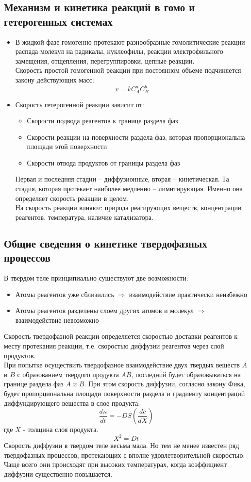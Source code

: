 \documentclass[14pt,a4paper]{scrartcl}
\begin{document}
\subsection*{Механизм и кинетика реакций в гомо и гетерогенных системах}
\begin{itemize}
	\item В жидкой фазе гомогенно протекают разнообразные гомолитические реакции распада молекул на радикалы, нуклеофилы, реакции электрофильного замещения, отщепления, перегруппировки, цепные реакции. \\
	Скорость простой гомогенной реакции при постоянном объеме подчиняется закону действующих масс:
	$$ v = k C_A^a C_B^b $$	
	\item Скорость гетерогенной реакции зависит от:
		\begin{itemize}
			\item Скорости подвода реагентов к границе раздела фаз
			\item Скорости реакции на поверхности раздела фаз, которая пропорциональна площади этой поверхности
			\item Скорости отвода продуктов от границы раздела фаз
		\end{itemize}
	Первая и последняя стадии -- диффузионные, вторая -- кинетическая. Та стадия, которая протекает наиболее медленно -- лимитирующая. Именно она определяет скорость реакции в целом. \\
	На скорость реакции влияют: природа реагирующих веществ, концентрации реагентов, температура, наличие катализатора.
\end{itemize}

\subsection*{Общие сведения о кинетике твердофазных процессов}
В твердом теле принципиально существуют две возможности:
\begin{itemize}
	\item Атомы реагентов уже сблизились $\Rightarrow$ взаимодействие практически неизбежно
	\item Атомы реагентов разделены слоем других атомов и молекул $\Rightarrow$ взаимодействие невозможно
\end{itemize}
Скорость твердофазной реакции определяется скоростью доставки реагентов к месту протекания реакции, т.е. скоростью диффузии реагентов через слой продуктов. \\
При попытке осуществить твердофазное взаимодействие двух твердых веществ $A$ и $B$ с образованием твердого продукта $AB$, последний будет образовываться на границе раздела фаз $A$ и $B$. При этом скорость диффузии, согласно закону Фика, будет пропорциональна площади поверхности раздела и градиенту концентраций диффундирующего вещества в слое продукта:
$$ \dfrac{dn}{dt} = -DS \left( \dfrac{dc}{dX} \right)  $$
где $X$ - толщина слоя продукта. 
$$ X^2 = Dt $$
Скорость диффузии в твердом теле весьма мала. Но тем не менее известен ряд твердофазных процессов, протекающих с вполне удовлетворительной скоростью. Чаще всего они происходят при высоких температурах, когда коэффициент диффузии существенно повышается.	
\end{document}
